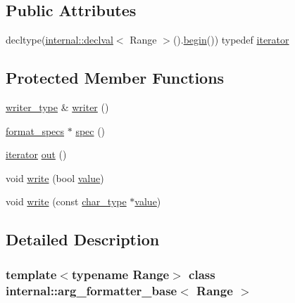 \subsection*{Public Attributes}
\begin{DoxyCompactItemize}
\item 
decltype(\hyperlink{namespaceinternal_a5f61aadb1d6afc8b79ef7ea57c39eafc}{internal\+::declval}$<$ Range $>$().\hyperlink{namespaceinternal_a265f36d9dee68d3f44381347ef2fd5cb}{begin}()) typedef \hyperlink{classinternal_1_1arg__formatter__base_a87622fdc9716fee6a6de2ae496e3a54f}{iterator}
\end{DoxyCompactItemize}
\subsection*{Protected Member Functions}
\begin{DoxyCompactItemize}
\item 
\hyperlink{classbasic__writer}{writer\+\_\+type} \& \hyperlink{classinternal_1_1arg__formatter__base_ad58c7a9790ec2bf6ed16f2caa1aa3a1f}{writer} ()
\item 
\hyperlink{classinternal_1_1arg__formatter__base_acff46f7da1afa536210eb77a2ea0d775}{format\+\_\+specs} $\ast$ \hyperlink{classinternal_1_1arg__formatter__base_aee5efc224d29ce5352d856cbb9afeffa}{spec} ()
\item 
\hyperlink{classinternal_1_1arg__formatter__base_a87622fdc9716fee6a6de2ae496e3a54f}{iterator} \hyperlink{classinternal_1_1arg__formatter__base_a01c4577755b7ce197ce0da3a94b5fc82}{out} ()
\item 
void \hyperlink{classinternal_1_1arg__formatter__base_afec2f8db2cc820b66ae5065737cbda8a}{write} (bool \hyperlink{classinternal_1_1value}{value})
\item 
void \hyperlink{classinternal_1_1arg__formatter__base_ab31e5e8e9512fba38b91b53d530fbff0}{write} (const \hyperlink{classinternal_1_1arg__formatter__base_a407930bf282880d2ca45dfa8f5d2034b}{char\+\_\+type} $\ast$\hyperlink{classinternal_1_1value}{value})
\end{DoxyCompactItemize}


\subsection{Detailed Description}
\subsubsection*{template$<$typename Range$>$\newline
class internal\+::arg\+\_\+formatter\+\_\+base$<$ Range $>$}



